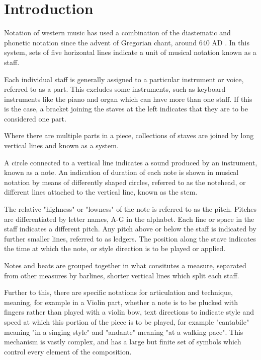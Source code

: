 \section{Introduction}
Notation of western music has used a combination of the diastematic and phonetic notation \parencite{RRastall} since the advent of Gregorian chant, around 640 AD \parencite{JPaterson}. In this system, sets of five horizontal lines indicate a unit of musical notation known as a \gls{staff}. 


Each individual staff is generally assigned to a particular instrument or voice, referred to as a part. This excludes some instruments, such as keyboard instruments like the piano and organ which can have more than one staff. If this is the case, a bracket joining the staves at the left indicates that they are to be considered one part.

Where there are multiple parts in a piece, collections of staves are joined by long vertical lines and known as a system. 
 
A circle connected to a vertical line indicates a sound produced by an instrument, known as a \gls{note}. An indication of duration of each note is shown in musical notation by means of differently shaped circles, referred to as the notehead, or different lines attached to the vertical line, known as the stem.

The relative "highness" or "lowness" of the note \parencite{classroom} is referred to as the pitch. Pitches are differentiated by letter names, A-G in the alphabet. Each line or space in the staff indicates a different pitch. Any pitch above or below the staff is indicated by further smaller lines, referred to as \gls{ledger}s. The position along the stave indicates the time at which the note, or style direction is to be played or applied. 

Notes and beats are grouped together in what consitutes a measure, separated from other measures by barlines, \parencite{classroom} shorter vertical lines which split each staff. 

Further to this, there are specific \gls{notation}s for \gls{articulation} and \gls{technique}, meaning, for example in a Violin part, whether a note is to be plucked with fingers rather than played with a violin bow, text directions to indicate style and speed at which this portion of the piece is to be played, for example "cantabile" meaning "in a singing style"\parencite{dictionary} and "andante" meaning "at a walking pace". This mechanism is vastly complex, and has a large but finite set of symbols which control every element of the composition.

